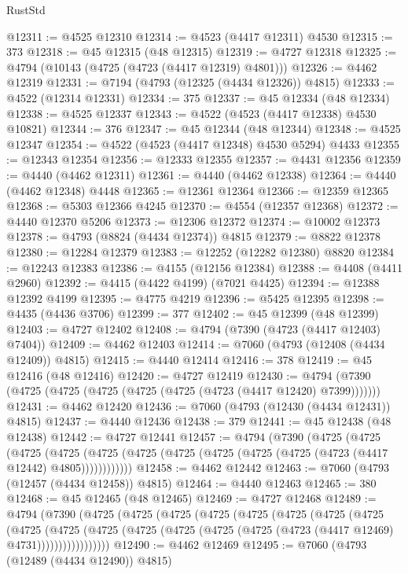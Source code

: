\begin{lexlean}{RustStd}
\begin{coremodule}
{\begin{coremodule}
{{{{{{{{{{{{{{{{{{{{{{{{{{{{{{{{{{{{{{{{{{{{{{{{{{{{{{{{{{{{@12311 := @4525 @12310
@12314 := @4523 (@4417 @12311) @4530
@12315 := 373
@12318 := @45 @12315 (@48 @12315)
@12319 := @4727 @12318
@12325 := @4794 (@10143 (@4725 (@4723 (@4417 @12319) @4801)))
@12326 := @4462 @12319
@12331 := @7194 (@4793 (@12325 (@4434 @12326)) @4815)
@12333 := @4522 (@12314 @12331)
@12334 := 375
@12337 := @45 @12334 (@48 @12334)
@12338 := @4525 @12337
@12343 := @4522 (@4523 (@4417 @12338) @4530 @10821)
@12344 := 376
@12347 := @45 @12344 (@48 @12344)
@12348 := @4525 @12347
@12354 := @4522 (@4523 (@4417 @12348) @4530 @5294) @4433
@12355 := @12343 @12354
@12356 := @12333 @12355
@12357 := @4431 @12356
@12359 := @4440 (@4462 @12311)
@12361 := @4440 (@4462 @12338)
@12364 := @4440 (@4462 @12348) @4448
@12365 := @12361 @12364
@12366 := @12359 @12365
@12368 := @5303 @12366 @4245
@12370 := @4554 (@12357 @12368)
@12372 := @4440 @12370 @5206
@12373 := @12306 @12372
@12374 := @10002 @12373
@12378 := @4793 (@8824 (@4434 @12374)) @4815
@12379 := @8822 @12378
@12380 := @12284 @12379
@12383 := @12252 (@12282 @12380) @8820
@12384 := @12243 @12383
@12386 := @4155 (@12156 @12384)
@12388 := @4408 (@4411 @2960)
@12392 := @4415 (@4422 @4199) (@7021 @4425)
@12394 := @12388 @12392 @4199
@12395 := @4775 @4219
@12396 := @5425 @12395
@12398 := @4435 (@4436 @3706)
@12399 := 377
@12402 := @45 @12399 (@48 @12399)
@12403 := @4727 @12402
@12408 := @4794 (@7390 (@4723 (@4417 @12403) @7404))
@12409 := @4462 @12403
@12414 := @7060 (@4793 (@12408 (@4434 @12409)) @4815)
@12415 := @4440 @12414
@12416 := 378
@12419 := @45 @12416 (@48 @12416)
@12420 := @4727 @12419
@12430 := @4794 (@7390 (@4725 (@4725 (@4725 (@4725 (@4725 (@4723 (@4417 @12420) @7399)))))))
@12431 := @4462 @12420
@12436 := @7060 (@4793 (@12430 (@4434 @12431)) @4815)
@12437 := @4440 @12436
@12438 := 379
@12441 := @45 @12438 (@48 @12438)
@12442 := @4727 @12441
@12457 := @4794
    (@7390
      (@4725
        (@4725
          (@4725
            (@4725 (@4725 (@4725 (@4725 (@4725 (@4725 (@4725 (@4723 (@4417 @12442) @4805))))))))))))
@12458 := @4462 @12442
@12463 := @7060 (@4793 (@12457 (@4434 @12458)) @4815)
@12464 := @4440 @12463
@12465 := 380
@12468 := @45 @12465 (@48 @12465)
@12469 := @4727 @12468
@12489 := @4794
    (@7390
      (@4725
        (@4725
          (@4725
            (@4725
              (@4725
                (@4725
                  (@4725
                    (@4725
                      (@4725
                        (@4725
                          (@4725
                            (@4725 (@4725 (@4725 (@4725 (@4723 (@4417 @12469) @4731)))))))))))))))))
@12490 := @4462 @12469
@12495 := @7060 (@4793 (@12489 (@4434 @12490)) @4815)
}}}}}}}}}}}}}}}}}}}}}}}}}}}}}}}}}}}}}}}}}}}}}}}}}}}}}}}}}}}}
\end{coremodule}}
\end{coremodule}
\end{lexlean}
